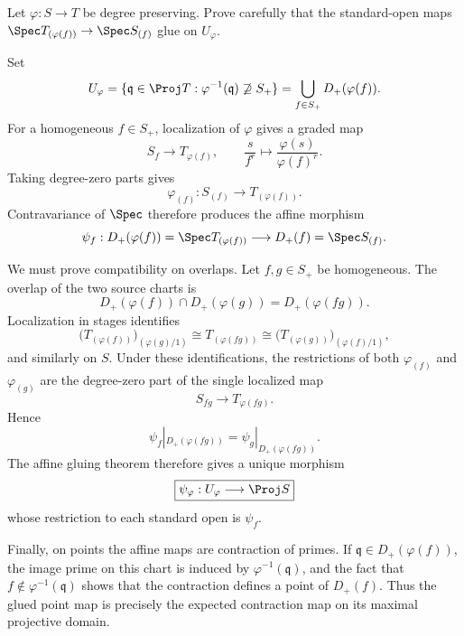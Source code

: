 \begin{problem}\label{prob:vi38-01}
Let \(\varphi:S\to T\) be degree preserving.  Prove carefully that the standard-open maps \(\Spec T_{(\varphi(f))}\to\Spec S_{(f)}\) glue on \(U_\varphi\).
\end{problem}

\ifdefined\FullProblemDossiers
\begin{solution}
Set
\[
U_\varphi
=
\{\mathfrak q\in\Proj T:\varphi^{-1}(\mathfrak q)\not\supseteq S_+\}
=
\bigcup_{f\in S_+}D_+(\varphi(f)).
\]
For a homogeneous \(f\in S_+\), localization of \(\varphi\) gives a graded map
\[
S_f\longrightarrow T_{\varphi(f)},
\qquad
\frac{s}{f^r}\longmapsto\frac{\varphi(s)}{\varphi(f)^r}.
\]
Taking degree-zero parts gives
\[
\varphi_{(f)}:S_{(f)}\longrightarrow T_{(\varphi(f))}.
\]
Contravariance of \(\Spec\) therefore produces the affine morphism
\[
\psi_f:
D_+(\varphi(f))=\Spec T_{(\varphi(f))}
\longrightarrow
D_+(f)=\Spec S_{(f)}.
\]

We must prove compatibility on overlaps.  Let \(f,g\in S_+\) be homogeneous.  The
overlap of the two source charts is
\[
D_+(\varphi(f))\cap D_+(\varphi(g))
=D_+(\varphi(fg)).
\]
Localization in stages identifies
\[
\bigl(T_{(\varphi(f))}\bigr)_{(\varphi(g)/1)}
\cong T_{(\varphi(fg))}
\cong
\bigl(T_{(\varphi(g))}\bigr)_{(\varphi(f)/1)},
\]
and similarly on \(S\).  Under these identifications, the restrictions of both
\(\varphi_{(f)}\) and \(\varphi_{(g)}\) are the degree-zero part of the single
localized map
\[
S_{fg}\longrightarrow T_{\varphi(fg)}.
\]
Hence
\[
\psi_f|_{D_+(\varphi(fg))}
=
\psi_g|_{D_+(\varphi(fg))}.
\]
The affine gluing theorem therefore gives a unique morphism
\[
\boxed{\psi_\varphi:U_\varphi\longrightarrow\Proj S}
\]
whose restriction to each standard open is \(\psi_f\).

Finally, on points the affine maps are contraction of primes.  If
\(\mathfrak q\in D_+(\varphi(f))\), the image prime on this chart is induced by
\(\varphi^{-1}(\mathfrak q)\), and the fact that \(f\notin\varphi^{-1}(\mathfrak q)\)
shows that the contraction defines a point of \(D_+(f)\).  Thus the glued point map
is precisely the expected contraction map on its maximal projective domain.
\end{solution}
\fi
